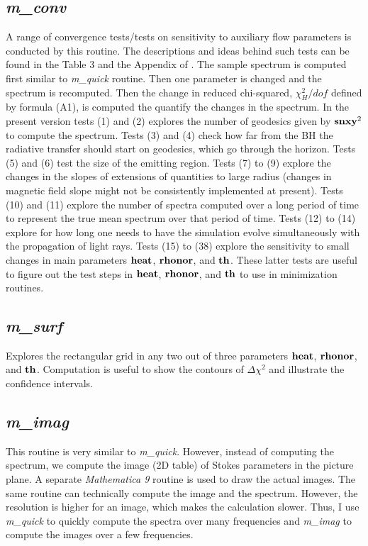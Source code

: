 \documentclass{emulateapj}
\newcommand{\mat}{\textit{Mathematica 9 }}
\begin{document}
\subsection{\textit{m\_conv}}
A range of convergence tests/tests on sensitivity to auxiliary flow parameters is conducted by this routine.
The descriptions and ideas behind such tests can be found in the Table 3 and the Appendix of \citet{Shcherbakov:2012appl}.
The sample spectrum is computed first similar to \textit{m\_quick} routine. Then one parameter is changed and the spectrum is recomputed.
Then the change in reduced chi-squared, $\chi^2_H/dof$ defined by formula (A1), is computed the quantify the changes in the spectrum.
In the present version tests (1) and (2) explores the number of geodesics given by ${\bf snxy}^2$ to compute the spectrum.
Tests (3) and (4) check how far from the BH the radiative transfer should start on geodesics, which go through the horizon.
Tests (5) and (6) test the size of the emitting region.
Tests (7) to (9) explore the changes in the slopes of extensions of quantities to large radius (changes in magnetic field slope
might not be consistently implemented at present).
Tests (10) and (11) explore the number of spectra computed over a long period of time to represent the true mean spectrum
over that period of time.
Tests (12) to (14) explore for how long one needs to have the simulation evolve simultaneously with the propagation of light rays.
Tests (15) to (38) explore the sensitivity to small changes in main parameters ${\bf heat}$, ${\bf rhonor}$, and ${\bf th}$.
These latter tests are useful to figure out the test steps in ${\bf heat}$, ${\bf rhonor}$, and ${\bf th}$
to use in minimization routines.

\subsection{\textit{m\_surf}}
Explores the rectangular grid in any two out of three parameters ${\bf heat}$, ${\bf rhonor}$, and ${\bf th}$.
Computation is useful to show the contours of $\Delta\chi^2$ and illustrate the confidence intervals.

\subsection{\textit{m\_imag}}
This routine is very similar to \textit{m\_quick}. However, instead of computing the spectrum, we compute
the image (2D table) of Stokes parameters in the picture plane. A separate \mat  routine is used to draw the actual images.
The same routine can technically compute the image and the spectrum.
However, the resolution is higher for an image, which makes the calculation slower.
Thus, I use \textit{m\_quick} to quickly compute the spectra over many frequencies and \textit{m\_imag} to compute
the images over a few frequencies.
\end{document}
